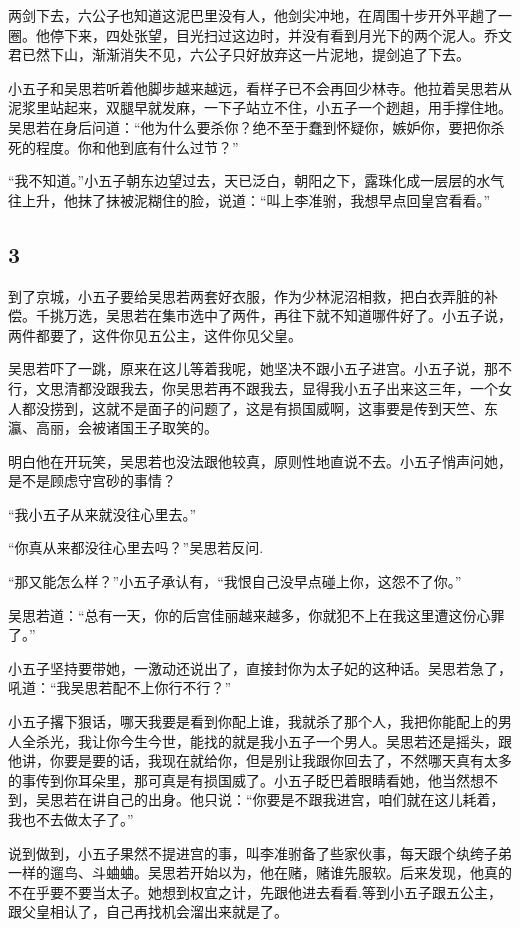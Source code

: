 两剑下去，六公子也知道这泥巴里没有人，他剑尖冲地，在周围十步开外平趟了一圈。他停下来，四处张望，目光扫过这边时，并没有看到月光下的两个泥人。乔文君已然下山，渐渐消失不见，六公子只好放弃这一片泥地，提剑追了下去。

小五子和吴思若听着他脚步越来越远，看样子已不会再回少林寺。他拉着吴思若从泥浆里站起来，双腿早就发麻，一下子站立不住，小五子一个趔趄，用手撑住地。吴思若在身后问道：“他为什么要杀你？绝不至于蠢到怀疑你，嫉妒你，要把你杀死的程度。你和他到底有什么过节？”

“我不知道。”小五子朝东边望过去，天已泛白，朝阳之下，露珠化成一层层的水气往上升，他抹了抹被泥糊住的脸，说道：“叫上李准驸，我想早点回皇宫看看。”
\newline

{\centering\subsection{3}}

到了京城，小五子要给吴思若两套好衣服，作为少林泥沼相救，把白衣弄脏的补偿。千挑万选，吴思若在集市选中了两件，再往下就不知道哪件好了。小五子说，两件都要了，这件你见五公主，这件你见父皇。

吴思若吓了一跳，原来在这儿等着我呢，她坚决不跟小五子进宫。小五子说，那不行，文思清都没跟我去，你吴思若再不跟我去，显得我小五子出来这三年，一个女人都没捞到，这就不是面子的问题了，这是有损国威啊，这事要是传到天竺、东瀛、高丽，会被诸国王子取笑的。

明白他在开玩笑，吴思若也没法跟他较真，原则性地直说不去。小五子悄声问她，是不是顾虑守宫砂的事情？

“我小五子从来就没往心里去。”

“你真从来都没往心里去吗？”吴思若反问.

“那又能怎么样？”小五子承认有，“我恨自己没早点碰上你，这怨不了你。”

吴思若道：“总有一天，你的后宫佳丽越来越多，你就犯不上在我这里遭这份心罪了。”

小五子坚持要带她，一激动还说出了，直接封你为太子妃的这种话。吴思若急了，吼道：“我吴思若配不上你行不行？”

小五子撂下狠话，哪天我要是看到你配上谁，我就杀了那个人，我把你能配上的男人全杀光，我让你今生今世，能找的就是我小五子一个男人。吴思若还是摇头，跟他讲，你要是要的话，我现在就给你，但是别让我跟你回去了，不然哪天真有太多的事传到你耳朵里，那可真是有损国威了。小五子眨巴着眼睛看她，他当然想不到，吴思若在讲自己的出身。他只说：“你要是不跟我进宫，咱们就在这儿耗着，我也不去做太子了。”

说到做到，小五子果然不提进宫的事，叫李准驸备了些家伙事，每天跟个纨绔子弟一样的遛鸟、斗蛐蛐。吴思若开始以为，他在赌，赌谁先服软。后来发现，他真的不在乎要不要当太子。她想到权宜之计，先跟他进去看看.等到小五子跟五公主，跟父皇相认了，自己再找机会溜出来就是了。

